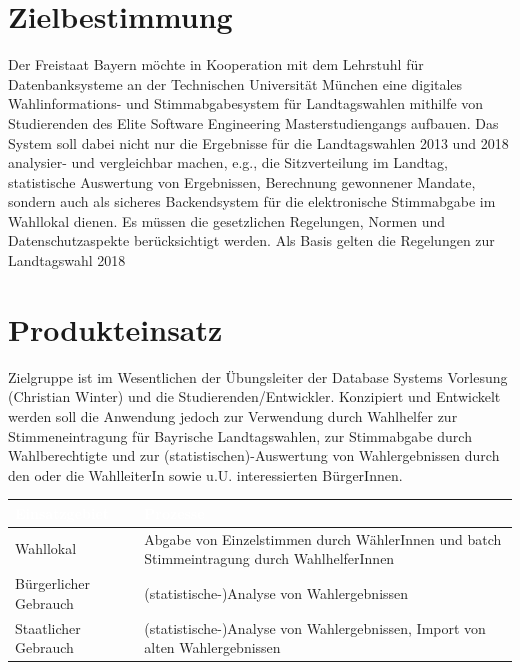 \documentclass[a4paper,12pt]{article}
\begin{document}
 \setcounter{page}{2}
 \tableofcontents          %
 \clearpage
 
\section{Zielbestimmung}
Der Freistaat Bayern möchte in Kooperation mit dem Lehrstuhl für 
Datenbanksysteme an der Technischen Universität München eine digitales 
Wahlinformations- und Stimmabgabesystem für Landtagswahlen mithilfe von 
Studierenden des Elite Software Engineering Masterstudiengangs aufbauen.
%
Das System soll dabei nicht nur die Ergebnisse für die Landtagswahlen 
2013 und 2018 analysier- und vergleichbar machen, e.g., die Sitzverteilung 
im Landtag, statistische Auswertung von Ergebnissen, Berechnung gewonnener
Mandate, sondern auch als sicheres Backendsystem für die elektronische 
Stimmabgabe im Wahllokal dienen. 
%
Es müssen die gesetzlichen Regelungen, Normen und Datenschutzaspekte
berücksichtigt werden. Als Basis gelten die Regelungen zur
Landtagswahl 2018

\section{Produkteinsatz}
Zielgruppe ist im Wesentlichen der Übungsleiter der Database Systems 
Vorlesung (Christian Winter) und die Studierenden/Entwickler. 
%
Konzipiert und Entwickelt werden soll die Anwendung jedoch zur Verwendung 
durch Wahlhelfer zur Stimmeneintragung für Bayrische Landtagswahlen, 
zur Stimmabgabe durch Wahlberechtigte und zur (statistischen)-Auswertung
von Wahlergebnissen durch den oder die WahlleiterIn sowie u.U. 
interessierten BürgerInnen.

\begin{center}
\begin{tabular}{|m{5cm}|m{10cm}|}
	\hline
  \rowcolor{TUMBlue} \textcolor{white}{\textbf{Einsatzgebiet}} & \textcolor{white}{\textbf{Prozesse}} \\
  \hline
  Wahllokal & Abgabe von Einzelstimmen durch WählerInnen und batch Stimmeintragung durch WahlhelferInnen \\
	\hline
  Bürgerlicher Gebrauch & (statistische-)Analyse von Wahlergebnissen \\
  \hline
  Staatlicher Gebrauch & (statistische-)Analyse von Wahlergebnissen, Import von alten Wahlergebnissen \\
	\hline
\end{tabular}
\end{center}
\end{document}
